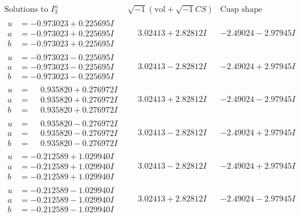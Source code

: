 \documentclass[1p]{elsarticle_modified}
\theoremstyle{definition}
\newcommand{\I}{\sqrt{-1}}
\begin{document}
$$\begin{array}{c|c|c}  
\text{Solutions to }I^u_{3}& \I (\text{vol} + \sqrt{-1}CS) & \text{Cusp shape}\\
 \hline 
\begin{aligned}
u &= -0.973023 + 0.225695 I \\
a &= -0.973023 + 0.225695 I \\
b &= -0.973023 + 0.225695 I\end{aligned}
 & \phantom{-}3.02413 + 2.82812 I & -2.49024 - 2.97945 I \\ \hline\begin{aligned}
u &= -0.973023 - 0.225695 I \\
a &= -0.973023 - 0.225695 I \\
b &= -0.973023 - 0.225695 I\end{aligned}
 & \phantom{-}3.02413 - 2.82812 I & -2.49024 + 2.97945 I \\ \hline\begin{aligned}
u &= \phantom{-}0.935820 + 0.276972 I \\
a &= \phantom{-}0.935820 + 0.276972 I \\
b &= \phantom{-}0.935820 + 0.276972 I\end{aligned}
 & \phantom{-}3.02413 + 2.82812 I & -2.49024 - 2.97945 I \\ \hline\begin{aligned}
u &= \phantom{-}0.935820 - 0.276972 I \\
a &= \phantom{-}0.935820 - 0.276972 I \\
b &= \phantom{-}0.935820 - 0.276972 I\end{aligned}
 & \phantom{-}3.02413 - 2.82812 I & -2.49024 + 2.97945 I \\ \hline\begin{aligned}
u &= -0.212589 + 1.029940 I \\
a &= -0.212589 + 1.029940 I \\
b &= -0.212589 + 1.029940 I\end{aligned}
 & \phantom{-}3.02413 - 2.82812 I & -2.49024 + 2.97945 I \\ \hline\begin{aligned}
u &= -0.212589 - 1.029940 I \\
a &= -0.212589 - 1.029940 I \\
b &= -0.212589 - 1.029940 I\end{aligned}
 & \phantom{-}3.02413 + 2.82812 I & -2.49024 - 2.97945 I \\ \hline\begin{aligned}

\end{aligned}
\end{array}$$
\end{document}
